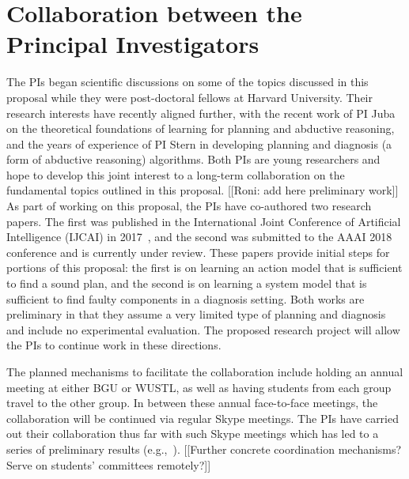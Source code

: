 \documentclass[12pt]{article}
\begin{document}
\section{Collaboration between the Principal Investigators}
The PIs began scientific discussions on some of the topics discussed in this proposal while they were post-doctoral fellows at Harvard University.
Their research interests have recently aligned further, 
with the recent work of PI Juba on the theoretical foundations of learning for planning and abductive reasoning, and the years of experience of PI Stern in developing planning and diagnosis (a form of abductive reasoning) algorithms. 
Both PIs are young researchers and hope to develop this joint interest to a long-term collaboration on the fundamental topics outlined in this proposal.
[[Roni: add here preliminary work]]
As part of working on this proposal, the PIs have co-authored two research papers. The first was published in the International Joint Conference of Artificial Intelligence (IJCAI) in  2017~\cite{stern2017efficientAndSafe}, and the second was submitted to the AAAI 2018 conference and is currently under review. These papers provide initial steps for portions of this proposal: the first is on learning an action model that is sufficient to find a sound plan, and the second is on learning a system model that is sufficient to find faulty components in a diagnosis setting. Both works are preliminary in that they assume a very limited type of planning and diagnosis and include no experimental evaluation. The proposed research project will allow the PIs to continue  work in these directions.


The planned mechanisms to facilitate the collaboration include holding an annual meeting at either BGU or WUSTL, as well as having students from each group travel to the other group. In between these annual face-to-face meetings, the collaboration will be continued via regular Skype meetings. The PIs have carried out their collaboration thus far with such Skype meetings which has led to a series of preliminary results (e.g.,~\cite{stern2017efficientAndSafe}). 
[[Further concrete coordination mechanisms? Serve on students' committees remotely?]]
\end{document}
